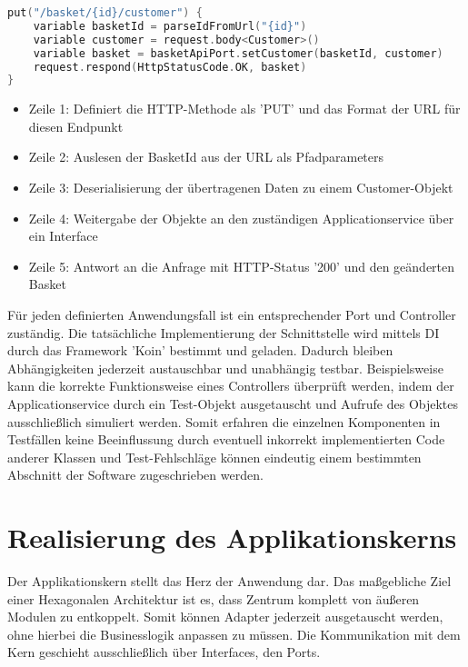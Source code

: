 \begin{minipage}{\linewidth} %
\begin{lstlisting}[caption={Beispiel eines Controllers zum aktualiseren von Kundendaten}, label={lst:controller}, language=Kotlin]
put("/basket/{id}/customer") { 
	variable basketId = parseIdFromUrl("{id}")
	variable customer = request.body<Customer>()  
	variable basket = basketApiPort.setCustomer(basketId, customer)
	request.respond(HttpStatusCode.OK, basket)
}
\end{lstlisting}
\end{minipage}

\begin{itemize}[noitemsep,nolistsep]
	\item Zeile 1: Definiert die HTTP-Methode als 'PUT' und das Format der URL für diesen Endpunkt
	\item Zeile 2: Auslesen der BasketId aus der URL als Pfadparameters 
	\item Zeile 3: Deserialisierung der übertragenen Daten zu einem Customer-Objekt
	\item Zeile 4: Weitergabe der Objekte an den zuständigen Applicationservice über ein Interface
	\item Zeile 5: Antwort an die Anfrage mit HTTP-Status '200' und den geänderten Basket
\end{itemize}

Für jeden definierten Anwendungsfall ist ein entsprechender Port und Controller zuständig. Die tatsächliche Implementierung der Schnittstelle wird mittels \Gls{DI} durch das Framework 'Koin' bestimmt und geladen. Dadurch bleiben Abhängigkeiten jederzeit austauschbar und unabhängig testbar. Beispielsweise kann die korrekte Funktionsweise eines Controllers überprüft werden, indem der Applicationservice durch ein Test-Objekt ausgetauscht und Aufrufe des Objektes ausschließlich simuliert werden. Somit erfahren die einzelnen Komponenten in Testfällen keine Beeinflussung durch eventuell inkorrekt implementierten Code anderer Klassen und Test-Fehlschläge können eindeutig einem bestimmten Abschnitt der Software zugeschrieben werden.

\section{Realisierung des Applikationskerns}

Der Applikationskern stellt das Herz der Anwendung dar. Das maßgebliche Ziel einer Hexagonalen Architektur ist es, dass Zentrum komplett von äußeren Modulen zu entkoppelt. Somit können Adapter jederzeit ausgetauscht werden, ohne hierbei die Businesslogik anpassen zu müssen. Die Kommunikation mit dem Kern geschieht ausschließlich über Interfaces, den Ports.

